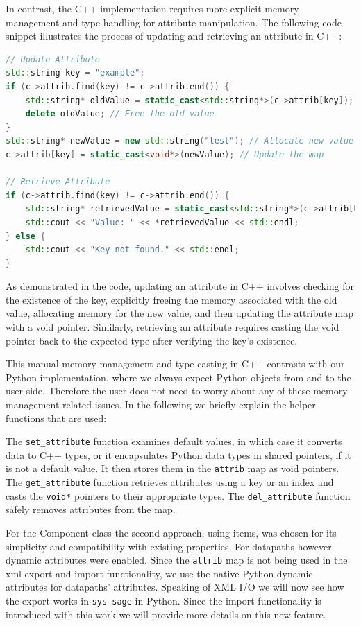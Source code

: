 In contrast, the C++ implementation requires more explicit memory management and type handling for attribute manipulation. The following code snippet illustrates the process of updating and retrieving an attribute in C++:

\begin{lstlisting}[language=C++, xleftmargin=4em, frame = single]
// Update Attribute
std::string key = "example";
if (c->attrib.find(key) != c->attrib.end()) {
    std::string* oldValue = static_cast<std::string*>(c->attrib[key]);
    delete oldValue; // Free the old value
}
std::string* newValue = new std::string("test"); // Allocate new value
c->attrib[key] = static_cast<void*>(newValue); // Update the map

// Retrieve Attribute
if (c->attrib.find(key) != c->attrib.end()) {
    std::string* retrievedValue = static_cast<std::string*>(c->attrib[key]);
    std::cout << "Value: " << *retrievedValue << std::endl;
} else {
    std::cout << "Key not found." << std::endl;
}
\end{lstlisting}

As demonstrated in the code, updating an attribute in C++ involves checking for the existence of the key, explicitly freeing the memory associated with the old value, allocating memory for the new value, and then updating the attribute map with a void pointer. Similarly, retrieving an attribute requires casting the void pointer back to the expected type after verifying the key's existence.\cite{sys-sage-docu} 

This manual memory management and type casting in C++ contrasts with our Python implementation, where we always expect Python objects from and to the user side. Therefore the user does not need to worry about any of these memory management related issues.
In the following we briefly explain the helper functions that are used:

\smallskip
The \verb|set_attribute| function examines default values, in which case it converts data to C++ types, or it encapsulates Python data types in shared pointers, if it is not a default value. It then stores them in the \verb|attrib| map as void pointers. The \verb|get_attribute| function retrieves attributes using a key or an index and casts the \verb|void*| pointers to their appropriate types. The \verb|del_attribute| function safely removes attributes from the map.

For the Component class the second approach, using items, was chosen for its simplicity and compatibility with existing properties. For datapaths however dynamic attributes were enabled. Since the \verb|attrib| map is not being used in the xml export and import functionality, we use the native Python dynamic attributes for datapaths' attributes. 
Speaking of XML I/O we will now see how the export works in \verb|sys-sage| in Python. Since the import functionality is introduced with this work we will provide more details on this new feature. 


